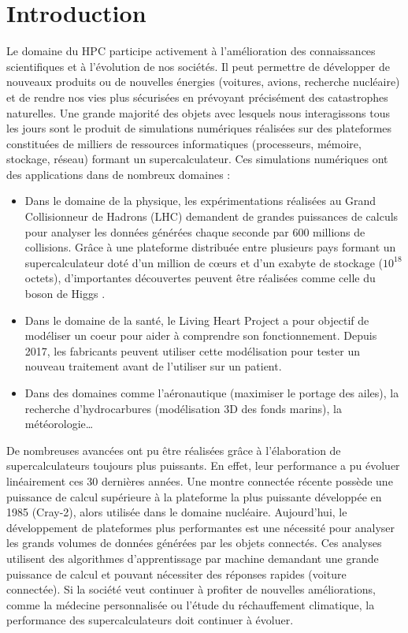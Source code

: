 \chapter{Introduction} \label{chap:intro}

Le domaine du \gls{HPC} participe activement à l'amélioration des connaissances scientifiques et à l'évolution de nos sociétés. Il peut permettre de développer de nouveaux produits ou de nouvelles énergies (voitures, avions, recherche nucléaire) et de rendre nos vies plus sécurisées en prévoyant précisément des catastrophes naturelles. Une grande majorité des objets avec lesquels nous interagissons tous les jours sont le produit de simulations numériques réalisées sur des plateformes constituées de milliers de ressources informatiques (processeurs, mémoire, stockage, réseau) formant un supercalculateur. Ces simulations numériques ont des applications dans de nombreux domaines :
\begin{itemize}
    \item Dans le domaine de la physique, les expérimentations réalisées au Grand Collisionneur de Hadrons (LHC) demandent de grandes puissances de calculs pour analyser les données générées chaque seconde par 600 millions de collisions. Grâce à une plateforme distribuée entre plusieurs pays formant un supercalculateur doté d'un million de cœurs et d'un exabyte de stockage ($10^{18}$ octets), d'importantes découvertes peuvent être réalisées comme celle du boson de Higgs \cite{Belyaev2017}. 
    \item Dans le domaine de la santé, le Living Heart Project \cite{Baillargeon2014} a pour objectif de modéliser un coeur pour aider à comprendre son fonctionnement. Depuis 2017, les fabricants peuvent utiliser cette modélisation pour tester un nouveau traitement avant de l'utiliser sur un patient.
    \item Dans des domaines comme l'aéronautique (maximiser le portage des ailes), la recherche d'hydrocarbures (modélisation 3D des fonds marins), la météorologie…

\end{itemize}

De nombreuses avancées ont pu être réalisées grâce à l'élaboration de supercalculateurs toujours plus puissants. En effet, leur performance a pu évoluer linéairement ces 30 dernières années. Une montre connectée récente possède une puissance de calcul supérieure à la plateforme la plus puissante développée en 1985 (Cray-2), alors utilisée dans le domaine nucléaire. Aujourd'hui, le développement de plateformes plus performantes est une nécessité pour analyser les grands volumes de données générées par les objets connectés. Ces analyses utilisent des algorithmes d'apprentissage par machine demandant une grande puissance de calcul et pouvant nécessiter des réponses rapides (voiture connectée). Si la société veut continuer à profiter de nouvelles améliorations, comme la médecine personnalisée ou l'étude du réchauffement climatique, la performance des supercalculateurs doit continuer à évoluer.


